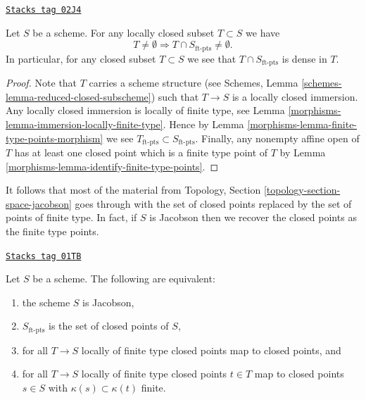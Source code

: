 \begin{lemma}
\label{morphisms-lemma-enough-finite-type-points}
\href{https://stacks.math.columbia.edu/tag/02J4}{\texttt{Stacks tag 02J4}}

Let $S$ be a scheme.
For any locally closed subset $T \subset S$ we have
$$
T \not = \emptyset
\Rightarrow
T \cap S_{\text{ft-pts}} \not = \emptyset.
$$
In particular, for any closed subset $T \subset S$ we
see that $T \cap S_{\text{ft-pts}}$ is dense in $T$.
\end{lemma}

\begin{proof}

Note that $T$ carries a scheme structure (see
Schemes, Lemma \ref{schemes-lemma-reduced-closed-subscheme})
such that $T \to S$ is a locally closed immersion.
Any locally closed immersion is locally of finite type,
see Lemma \ref{morphisms-lemma-immersion-locally-finite-type}.
Hence by Lemma \ref{morphisms-lemma-finite-type-points-morphism}
we see $T_{\text{ft-pts}} \subset S_{\text{ft-pts}}$.
Finally, any nonempty affine open of $T$ has at least one closed point
which is a finite type point of $T$ by
Lemma \ref{morphisms-lemma-identify-finite-type-points}.
\end{proof}

It follows that most of the material from
Topology, Section \ref{topology-section-space-jacobson} goes through
with the set of closed points replaced by the set of points of
finite type.
In fact, if $S$ is Jacobson then we recover the closed points as
the finite type points.

\begin{lemma}
\label{morphisms-lemma-jacobson-finite-type-points}
\href{https://stacks.math.columbia.edu/tag/01TB}{\texttt{Stacks tag 01TB}}

Let $S$ be a scheme. The following are equivalent:
\begin{enumerate}
\item the scheme $S$ is Jacobson,
\item $S_{\text{ft-pts}}$ is the set of closed points of $S$,
\item for all $T \to S$ locally of finite type
closed points map to closed points, and
\item for all $T \to S$ locally of finite type
closed points $t \in T$ map to closed points $s \in S$ with
$\kappa(s) \subset \kappa(t)$ finite.
\end{enumerate}
\end{lemma}

